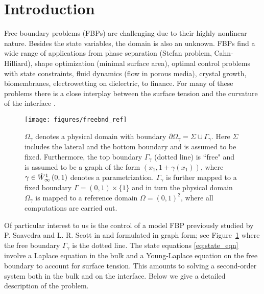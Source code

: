 \documentclass[final]{siamltex}
\begin{document}
\section{Introduction} \label{s:intro}
Free boundary problems (FBPs) are challenging due to their highly nonlinear nature. Besides the 
state variables, the domain is also an unknown. FBPs find a wide range of applications from phase
separation (Stefan problem, Cahn-Hilliard), shape optimization (minimal surface area), optimal 
control problems with state constraints, fluid dynamics (flow in porous media), crystal growth, 
biomembranes, electrowetting on dielectric, to finance. For many of these problems  there is a close 
interplay between the surface tension and the curvature of
the interface \cite{SWalker_BShapiro_RNochetto_2009a, SWalker_ABonito_RNochetto_2010a}. 
\begin{figure}[H]
\centering
\texttt{[image: figures/freebnd\_ref]}
\caption{$\Omega_{\gamma}$ denotes a physical domain with boundary 
               $\partial \Omega_{\gamma} = \Sigma \cup \Gamma_{\gamma}$. Here $\Sigma$ includes the lateral and the 
               bottom boundary and is assumed to be fixed. Furthermore, the top boundary $\Gamma_{\gamma}$ (dotted line) 
               is ``free" and is assumed to be a graph of the form $(x_1,1+\gamma(x_1))$, where $\gamma \in {{\mathring{W}^{{1}}_{{\infty}}\del{{0,1}}}}$ 
               denotes a parametrization. $\Gamma_{\gamma}$ is further mapped to a fixed boundary $\Gamma = (0,1) \times \{1\}$ and in 
               turn the physical domain $\Omega_{\gamma}$ is mapped to a reference domain $\Omega = (0,1)^2$, where all 
               computations are carried out.} 
\label{f:domain}
\end{figure}
\noindent
Of particular interest to us is the control of a model FBP previously studied by 
P. Saavedra and L. R. Scott in \cite{PSaavedra_RScott_1991} and formulated in graph form; see Figure~\ref{f:domain} where the free boundary $\Gamma_\gamma$ is the dotted line.  
The state equations \eqref{eq:state_eqn} involve 
a Laplace equation in the  bulk and a Young-Laplace equation on the free boundary to account for surface tension. 
This amounts to solving a second-order system both in the bulk and on the interface. Below we give a detailed 
description of the problem. 
\end{document}
